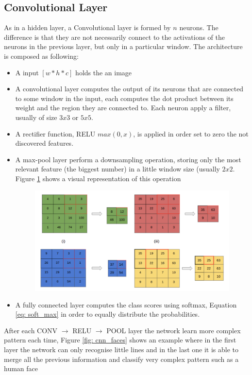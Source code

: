 \documentclass[11pt]{article}
\begin{document}
\subsection{Convolutional Layer}
As in a hidden layer, a Convolutional layer is formed by $n$ neurons. The difference is that they are not necessarily connect to the activations of the neurons in the previous layer, but only in a particular window.
The architecture is composed as following:
\begin{itemize}
	\item A input $[w*h*c]$ holds the an image
	\item A convolutional layer computes the output of its neurons that are connected to some window in the input, each computes the dot product between its weight and the region they are connected to. Each neuron apply a filter, usually of size $3x3$ or $5x5$.
	\item A rectifier function, RELU $max(0,x)$, is applied in order set to zero the not discovered features.
	\item A max-pool layer perform a downsampling operation, storing only the most relevant feature (the biggest number) in a little window size (usually $2x2$. Figure \ref{fig: pool} shows a visual representation of this operation
\begin{figure}[H]
\centering
	\includegraphics[scale=0.5]{images/pool}
	\caption{}
	\label{fig: pool}
\end{figure}
	\item A fully connected layer computes the class scores using softmax, Equation \ref{eq: soft_max} in order to equally distribute the probabilities.
\end{itemize}
After each CONV $\rightarrow$ RELU $\rightarrow$ POOL layer the network learn more complex pattern each time, Figure \ref{fig: cnn_faces} shows an example where in the first layer the network can only recognise little lines and in the last one it is able to merge all the previous information and classify very complex pattern such as a human face
\end{document}
